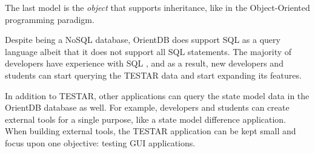 The last model is the \hypertarget{db:object}{\emph{object}} that supports inheritance, like in the Object-Oriented programming paradigm.\par

Despite being a NoSQL database, OrientDB does support SQL as a query language \cite{sql-lang} albeit that it does not support all SQL statements. The majority of developers have experience with SQL \cite{sql-stats}, and as a result, new developers and students can start querying the TESTAR data and start expanding its features.\par

In addition to TESTAR, other applications can query the state model data in the OrientDB database as well. For example, developers and students can create external tools for a single purpose, like a state model difference application. When building external tools, the TESTAR application can be kept small and focus upon one objective: testing GUI applications. 